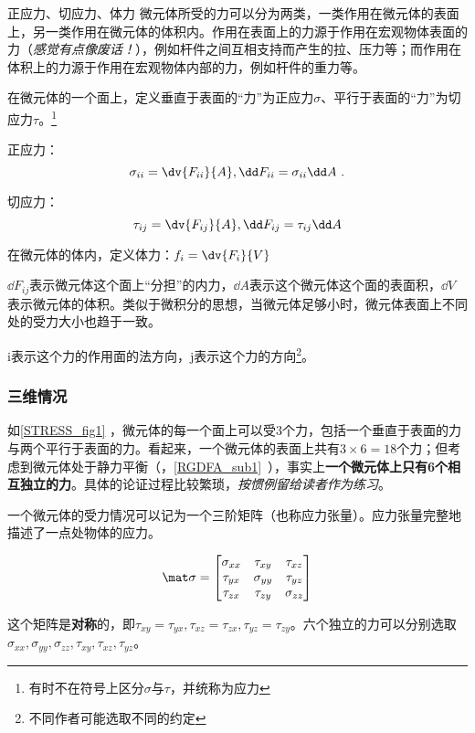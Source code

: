\begin{definition}{正应力、切应力、体力}
微元体所受的力可以分为两类，一类作用在微元体的表面上，另一类作用在微元体的体积内。作用在表面上的力源于作用在宏观物体表面的力（\textsl{感觉有点像废话！}），例如杆件之间互相支持而产生的拉、压力等；而作用在体积上的力源于作用在宏观物体内部的力，例如杆件的重力等。

在微元体的一个面上，定义垂直于表面的“力”为正应力$\sigma$、平行于表面的“力”为切应力$\tau$。\footnote{有时不在符号上区分$\sigma$与$\tau$，并统称为应力}

正应力：$$\sigma_{ii} =\dv{F_{ii}}{A}, \dd F_{ii} = \sigma_{ii} \dd A~.$$

切应力：$$\tau_{ij}=\dv{F_{ij}}{A}, \dd F_{ij} = \tau_{ij} \dd A$$

在微元体的体内，定义体力：$f_i = \dv{F_i}{V}$

$\dd F_{ij}$表示微元体这个面上“分担”的内力，$\dd A$表示这个微元体这个面的表面积，$\dd V$表示微元体的体积。类似于微积分的思想，当微元体足够小时，微元体表面上不同处的受力大小也趋于一致。

i表示这个力的作用面的法方向，j表示这个力的方向\footnote{不同作者可能选取不同的约定}。
\end{definition}

\subsubsection{三维情况}
如\autoref{STRESS_fig1} ，微元体的每一个面上可以受$3$个力，包括一个垂直于表面的力与两个平行于表面的力。看起来，一个微元体的表面上共有$3\times6=18$个力；但考虑到微元体处于静力平衡（，\autoref{RGDFA_sub1}~），事实上\textbf{一个微元体上只有6个相互独立的力}。具体的论证过程比较繁琐，\textsl{按惯例留给读者作为练习}。

一个微元体的受力情况可以记为一个三阶矩阵（也称应力张量）。应力张量完整地描述了一点处物体的应力。

\begin{equation}
\mat \sigma=
\begin{bmatrix}
\sigma_{xx} & \tau_{xy} & \tau_{xz} \\
\tau_{yx} & \sigma_{yy} & \tau_{yz} \\
\tau_{zx} & \tau_{zy} & \sigma_{zz} \\
\end{bmatrix}
\end{equation}

这个矩阵是\textbf{对称}的，即$\tau_{xy} = \tau_{yx}, \tau_{xz}=\tau_{zx}, \tau_{yz}=\tau_{zy}$。六个独立的力可以分别选取 $\sigma_{xx}, \sigma_{yy},\sigma_{zz}, \tau_{xy}, \tau_{xz},  \tau_{yz}$。

